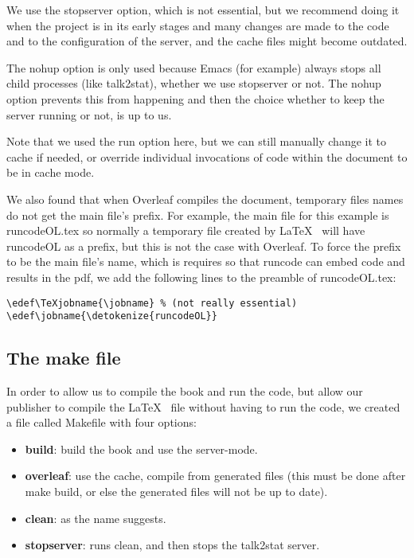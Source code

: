 \documentclass[12pt]{article}
\edef\TeXjobname{\jobname} %
\edef\jobname{\detokenize{runcodeOL}}
\begin{document}
We use the stopserver option, which is not essential, but we recommend doing it when the project is in its early stages and many changes are made to the code and to the configuration of the server, and the cache files might become outdated.

The nohup option is only used because Emacs (for example) always stops all child processes (like talk2stat), whether we use stopserver or not. The nohup option prevents this from happening and then the choice whether to keep the server running or not, is up to us.

Note that we used the run option here, but we can still manually change it to cache if needed, or override individual invocations of code within the document to be in cache mode.

\bigskip
We also  found that when Overleaf compiles the document, temporary files names do not get the main file's prefix. For example, the main file for this example is runcodeOL.tex so normally a temporary file created by \LaTeX~ will have runcodeOL as a prefix, but this is not the case with Overleaf. To force the prefix to be the main file's name, which is requires so that runcode can embed code and results in the pdf, we add the following lines to the preamble of runcodeOL.tex:
\begin{tcolorbox}
\begin{Verbatim}
\edef\TeXjobname{\jobname} % (not really essential)
\edef\jobname{\detokenize{runcodeOL}}
\end{Verbatim}
\end{tcolorbox}

\subsection*{The make file}

In order to allow us to compile the book and run the code, but allow our publisher to compile the \LaTeX~ file without having to run the code, we created a file called Makefile with four options:
\begin{itemize}
 \item \textbf{build}: build the book and use the server-mode.
 \item \textbf{overleaf}: use the cache, compile from generated files (this must be done after make build, or else the generated files will not be up to date).
 \item \textbf{clean}: as the name suggests.
 \item \textbf{stopserver}: runs clean, and then stops the talk2stat server.
\end{itemize}
\end{document}
